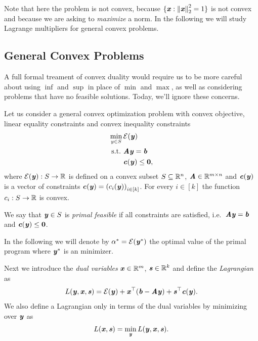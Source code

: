 Note that here the problem is not convex, because $\{ \boldsymbol{\mathit{x}}: \left\| \boldsymbol{\mathit{x}} \right\|_2^2 =
1 \}$ is not convex and because we are asking to \emph{maximize} a norm.
In the following we will study Lagrange multipliers for general convex problems.

\subsection{General Convex Problems}

A full formal treament of convex duality would require us to be more careful
about using $\inf$ and $\sup$ in place of $\min$ and $\max$, as well
as considering problems that have no feasible solutions.
Today, we'll ignore these concerns.

Let us consider a general convex optimization problem with convex objective, linear equality constraints and convex inequality constraints
\begin{align}
  \label{eq:primalprob}
     \min_{y \in S}{} & \energy(\yy) \\ \nonumber
\text{s.t.}\  & \AA\yy = \bb \\ \nonumber
              & \cc(\yy) \leq \veczero,
\end{align}
where $\mathcal{E}(\boldsymbol{\mathit{y}}): S \rightarrow \mathbb{R}$ is defined on a convex subset $S \subseteq \mathbb{R}^n$, $\boldsymbol{\mathit{A}} \in \mathbb{R}^{m\times n}$
and $\boldsymbol{\mathit{c}}(\boldsymbol{\mathit{y}})$ is a vector of constraints $\boldsymbol{\mathit{c}}(\boldsymbol{\mathit{y}}) = \left(c_i(\boldsymbol{\mathit{y}})\right)_{i \in [k]}$.
For every $i \in [k]$ the function $c_i: S \rightarrow \mathbb{R}$ is convex.

\begin{definition}
We say that $\boldsymbol{\mathit{y}} \in S$ is \emph{primal feasible} if all constraints are satisfied, i.e.~$\boldsymbol{\mathit{A}}\boldsymbol{\mathit{y}} = \boldsymbol{\mathit{b}}$ and $\boldsymbol{\mathit{c}}(\boldsymbol{\mathit{y}}) \leq \boldsymbol{0}$.
\end{definition}

In the following we will denote by $\alpha^* = \mathcal{E}(\boldsymbol{\mathit{y}}^*)$ the optimal value of the primal program where $\boldsymbol{\mathit{y}}^*$ is an minimizer.

\begin{definition}
Next we introduce the \emph{dual variables} $\boldsymbol{\mathit{x}} \in \mathbb{R}^m$, $\boldsymbol{\mathit{s}} \in \mathbb{R}^k$ and define the \emph{Lagrangian} as
\begin{equation*} L(\boldsymbol{\mathit{y}}, \boldsymbol{\mathit{x}}, \boldsymbol{\mathit{s}}) = \mathcal{E}(\boldsymbol{\mathit{y}}) + \boldsymbol{\mathit{x}}^{\top}(\boldsymbol{\mathit{b}}-\boldsymbol{\mathit{A}}\boldsymbol{\mathit{y}}) + \boldsymbol{\mathit{s}}^{\top}\boldsymbol{\mathit{c}}(\boldsymbol{\mathit{y}}). \end{equation*}
We also define a Lagrangian only in terms of the dual variables by minimizing over $\boldsymbol{\mathit{y}}$ as
\begin{equation*} L(\boldsymbol{\mathit{x}}, \boldsymbol{\mathit{s}}) = \min_{\boldsymbol{\mathit{y}}}L(\boldsymbol{\mathit{y}}, \boldsymbol{\mathit{x}}, \boldsymbol{\mathit{s}}). \end{equation*}
\end{definition}

